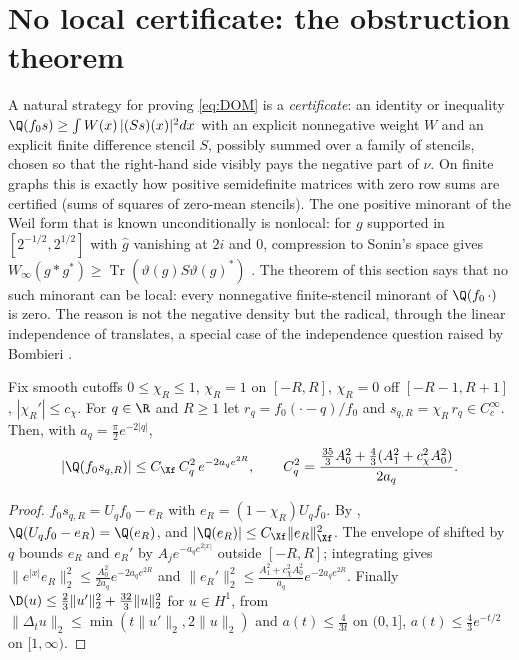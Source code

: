 \section{No local certificate: the obstruction theorem}\label{sec:obstruction}

A natural strategy for proving \eqref{eq:DOM} is a \emph{certificate}: an identity or inequality
$\Q(f_0s)\ge\int W(x)\,|(Ss)(x)|^2dx$ with an explicit nonnegative weight $W$ and an explicit finite difference
stencil $S$, possibly summed over a family of stencils, chosen so that the right-hand side visibly pays the negative
part of $\nu$. On finite graphs this is exactly how positive semidefinite matrices with zero row sums are
certified (sums of squares of zero-mean stencils). The one positive minorant of the Weil form that is known unconditionally is
nonlocal: for $g$ supported in $[2^{-1/2},2^{1/2}]$ with $\widehat g$ vanishing at $2i$ and $0$, compression to Sonin's space gives
$W_\infty(g*g^*)\ge\operatorname{Tr}(\vartheta(g)S\vartheta(g)^*)$ \cite[Thm.~7.1]{Connes2026}. The theorem of this section says
that no such minorant can be local: every nonnegative finite-stencil minorant of $\Q(f_0\,\cdot)$ is zero. The reason is not
the negative density but the radical, through the linear independence of translates, a special case of the independence question
raised by Bombieri \cite[Introduction, (iii)]{BOMBIERI-WEILQF-2000}.

\begin{lemma}\label{lem:budget}
Fix smooth cutoffs $0\le\chi_R\le1$, $\chi_R=1$ on $[-R,R]$, $\chi_R=0$ off $[-R-1,R+1]$, $|\chi_R'|\le c_\chi$.
For $q\in\R$ and $R\ge1$ let $r_q=f_0(\cdot-q)/f_0$ and $s_{q,R}=\chi_R\,r_q\in C_c^\infty$. Then, with $a_q=\frac\pi2e^{-2|q|}$,
\begin{equation}\label{eq:budget}
 |\Q(f_0s_{q,R})|\le C_{\Xf}\,C_q^2\,e^{-2a_qe^{2R}},\qquad
 C_q^2=\frac{\frac{35}{3}A_0^2+\frac43(A_1^2+c_\chi^2A_0^2)}{2a_q}.
\end{equation}
\end{lemma}
\begin{proof}
$f_0s_{q,R}=U_qf_0-e_R$ with $e_R=(1-\chi_R)U_qf_0$. By , $\Q(U_qf_0-e_R)=\Q(e_R)$, and
$|\Q(e_R)|\le C_{\Xf}\|e_R\|_{\Xf}^2$. The envelope of  shifted by $q$ bounds $e_R$ and $e_R'$ by
$A_je^{-a_qe^{2|x|}}$ outside $[-R,R]$; integrating gives $\|e^{|x|}e_R\|_2^2\le\frac{A_0^2}{2a_q}e^{-2a_qe^{2R}}$ and
$\|e_R'\|_2^2\le\frac{A_1^2+c_\chi^2A_0^2}{a_q}e^{-2a_qe^{2R}}$. Finally
$\D(u)\le\frac23\|u'\|_2^2+\frac{32}3\|u\|_2^2$ for $u\in H^1$, from $\|\Delta_tu\|_2\le\min(t\|u'\|_2,2\|u\|_2)$ and
$a(t)\le\frac4{3t}$ on $(0,1]$, $a(t)\le\frac43e^{-t/2}$ on $[1,\infty)$.
\end{proof}

